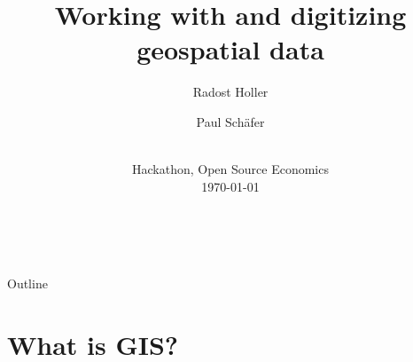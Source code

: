 

\newcommand{\balA}[1][1]{BAL$^\mathup{I}_{#1:#1}$\xspace}
\newcommand{\unbalA}[1][n]{UNBAL$^\mathup{I}_{1:#1}$\xspace}
\newcommand{\balB}[1][1]{BAL$^\mathup{II}_{#1:#1}$\xspace}
\newcommand{\unbalB}[1][n]{UNBAL$^\mathup{II}_{#1:1}$\xspace}



\title{Working with and digitizing geospatial data}


\author[Holler and Schäfer]{%
	Radost Holler \and
	Paul Schäfer
} %


\date{%
	\\
	Hackathon, Open Source Economics \\[\medskipamount]
	\textmd{\today}%
}





\begin{frame}[standout]{~}
	
	\titlepage%
	
\end{frame}


\begin{frame}[standout]{Outline}
	
	\medskip
	\tableofcontents
	
\end{frame}






\section{What is GIS?}


